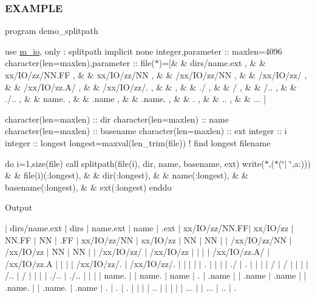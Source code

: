 \subsubsection*{E\+X\+A\+M\+P\+LE}

program demo\+\_\+splitpath

use \hyperlink{namespacem__io}{m\+\_\+io}, only \+: splitpath implicit none integer,parameter \+:\+: maxlen=4096 character(len=maxlen),parameter \+:\+: file($\ast$)=\mbox{[}\& \& \textquotesingle{}dirs/name.\+ext \textquotesingle{}, \& \& \textquotesingle{}xx/\+I\+O/zz/\+N\+N.\+FF \textquotesingle{}, \& \& \textquotesingle{}xx/\+I\+O/zz/\+NN \textquotesingle{}, \& \& \textquotesingle{}/xx/\+I\+O/zz/\+NN \textquotesingle{}, \& \& \textquotesingle{}/xx/\+I\+O/zz/ \textquotesingle{}, \& \& \textquotesingle{}/xx/\+I\+O/zz.A/ \textquotesingle{}, \& \& \textquotesingle{}/xx/\+I\+O/zz/. \textquotesingle{}, \& \& \textquotesingle{} \textquotesingle{}, \& \& \textquotesingle{}./ \textquotesingle{}, \& \& \textquotesingle{}/ \textquotesingle{}, \& \& \textquotesingle{}/.. \textquotesingle{}, \& \& \textquotesingle{}./.. \textquotesingle{}, \& \& \textquotesingle{}name. \textquotesingle{}, \& \& \textquotesingle{}.name \textquotesingle{}, \& \& \textquotesingle{}.name. \textquotesingle{}, \& \& \textquotesingle{}. \textquotesingle{}, \& \& \textquotesingle{}.. \textquotesingle{}, \& \& \textquotesingle{}... \textquotesingle{}\mbox{]}

character(len=maxlen) \+:\+: dir character(len=maxlen) \+:\+: name character(len=maxlen) \+:\+: basename character(len=maxlen) \+:\+: ext integer \+:\+: i integer \+:\+: longest longest=maxval(len\+\_\+trim(file)) ! find longest filename

do i=1,size(file) call splitpath(file(i), dir, name, basename, ext) write($\ast$,\textquotesingle{}($\ast$(\char`\"{}$\vert$ \char`\"{},a\+:))\textquotesingle{}) \& \& file(i)(\+:longest), \& \& dir(\+:longest), \& \& name(\+:longest), \& \& basename(\+:longest), \& \& ext(\+:longest) enddo

Output

$\vert$ dirs/name.\+ext $\vert$ dirs $\vert$ name.\+ext $\vert$ name $\vert$ .ext $\vert$ xx/\+I\+O/zz/\+N\+N.\+FF$\vert$ xx/\+I\+O/zz $\vert$ N\+N.\+FF $\vert$ NN $\vert$ .FF $\vert$ xx/\+I\+O/zz/\+NN $\vert$ xx/\+I\+O/zz $\vert$ NN $\vert$ NN $\vert$ $\vert$ /xx/\+I\+O/zz/\+NN $\vert$ /xx/\+I\+O/zz $\vert$ NN $\vert$ NN $\vert$ $\vert$ /xx/\+I\+O/zz/ $\vert$ /xx/\+I\+O/zz $\vert$ $\vert$ $\vert$ $\vert$ /xx/\+I\+O/zz.A/ $\vert$ /xx/\+I\+O/zz.A $\vert$ $\vert$ $\vert$ $\vert$ /xx/\+I\+O/zz/. $\vert$ /xx/\+I\+O/zz/. $\vert$ $\vert$ $\vert$ $\vert$ $\vert$ . $\vert$ $\vert$ $\vert$ $\vert$ ./ $\vert$ . $\vert$ $\vert$ $\vert$ $\vert$ / $\vert$ / $\vert$ $\vert$ $\vert$ $\vert$ /.. $\vert$ / $\vert$ $\vert$ $\vert$ $\vert$ ./.. $\vert$ ./.. $\vert$ $\vert$ $\vert$ $\vert$ name. $\vert$ $\vert$ name. $\vert$ name $\vert$ . $\vert$ .name $\vert$ $\vert$ .name $\vert$ .name $\vert$ $\vert$ .name. $\vert$ $\vert$ .name. $\vert$ .name $\vert$ . $\vert$ . $\vert$ . $\vert$ $\vert$ $\vert$ $\vert$ .. $\vert$ $\vert$ $\vert$ $\vert$ $\vert$ ... $\vert$ $\vert$ ... $\vert$ .. $\vert$ . 

